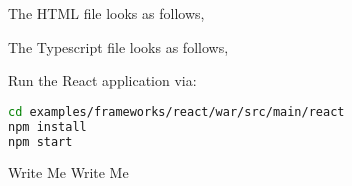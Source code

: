 The HTML file looks as follows,


The Typescript file looks as follows,


Run the React application via:
\begin{lstlisting}[language=bash]
cd examples/frameworks/react/war/src/main/react
npm install
npm start
\end{lstlisting}

\begin{TODO}{Write Me}
	Write Me
\end{TODO}